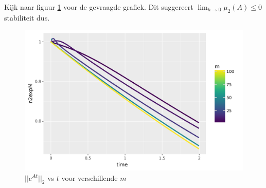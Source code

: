 \documentclass{article}
\begin{document}
Kijk naar figuur \ref{fig:mnexp} voor de gevraagde grafiek. Dit suggereert $\lim_{h \to 0} \mu_{2}(A) \le 0$ stabiliteit dus.

\begin{figure}
\includegraphics[width=\linewidth]{oefening2.png}
\caption{ $||e^{At}||_{2}$ vs $t$ voor verschillende $m$}
  \label{fig:mnexp}
\end{figure}

\end{document}

